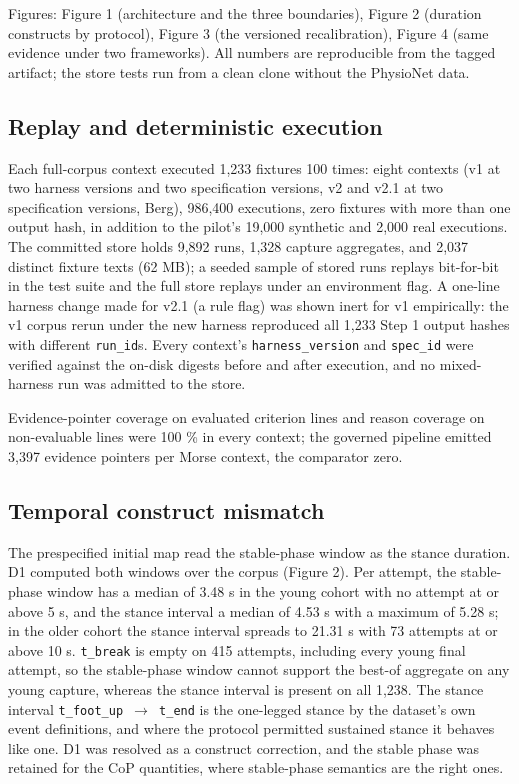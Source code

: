 \documentclass[11pt]{article}
\begin{document}
Figures: Figure 1 (architecture and the three boundaries), Figure 2 (duration constructs by protocol), Figure 3 (the versioned recalibration), Figure 4 (same evidence under two frameworks). All numbers are reproducible from the tagged artifact; the store tests run from a clean clone without the PhysioNet data.

\subsection{Replay and deterministic execution}\label{replay-and-deterministic-execution}

Each full-corpus context executed 1,233 fixtures 100 times: eight contexts (v1 at two harness versions and two specification versions, v2 and v2.1 at two specification versions, Berg), 986,400 executions, zero fixtures with more than one output hash, in addition to the pilot's 19,000 synthetic and 2,000 real executions. The committed store holds 9,892 runs, 1,328 capture aggregates, and 2,037 distinct fixture texts (62 MB); a seeded sample of stored runs replays bit-for-bit in the test suite and the full store replays under an environment flag. A one-line harness change made for v2.1 (a rule flag) was shown inert for v1 empirically: the v1 corpus rerun under the new harness reproduced all 1,233 Step 1 output hashes with different \texttt{run\_id}s. Every context's \texttt{harness\_version} and \texttt{spec\_id} were verified against the on-disk digests before and after execution, and no mixed-harness run was admitted to the store.

Evidence-pointer coverage on evaluated criterion lines and reason coverage on non-evaluable lines were 100 \% in every context; the governed pipeline emitted 3,397 evidence pointers per Morse context, the comparator zero.

\subsection{Temporal construct mismatch}\label{temporal-construct-mismatch}

The prespecified initial map read the stable-phase window as the stance duration. D1 computed both windows over the corpus (Figure 2). Per attempt, the stable-phase window has a median of 3.48 s in the young cohort with no attempt at or above 5 s, and the stance interval a median of 4.53 s with a maximum of 5.28 s; in the older cohort the stance interval spreads to 21.31 s with 73 attempts at or above 10 s. \texttt{t\_break} is empty on 415 attempts, including every young final attempt, so the stable-phase window cannot support the best-of aggregate on any young capture, whereas the stance interval is present on all 1,238. The stance interval \texttt{t\_foot\_up\ $\rightarrow$\ t\_end} is the one-legged stance by the dataset's own event definitions, and where the protocol permitted sustained stance it behaves like one. D1 was resolved as a construct correction, and the stable phase was retained for the CoP quantities, where stable-phase semantics are the right ones.
\end{document}
